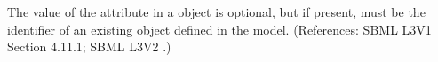 The value of the attribute  in a \Reaction object is
optional, but if present, must be the identifier of an existing
\Compartment object defined in the model.  (References: SBML L3V1 Section 4.11.1; SBML L3V2
.)
